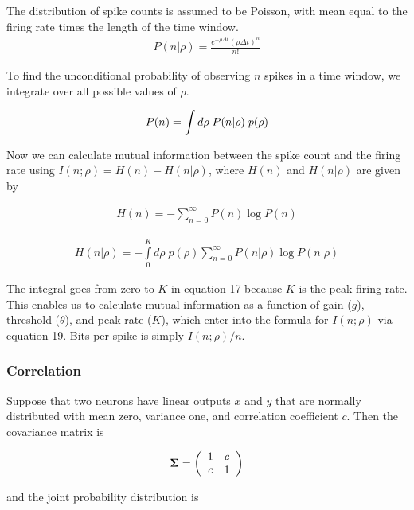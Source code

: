 \documentclass[12pt]{article}
\begin{document}
\noindent The distribution of spike counts is assumed to be Poisson, with mean equal to the firing rate times the length of the time window.
\begin{align}
\displaystyle P(n|\rho) = \frac{e^{-\rho\Delta t}(\rho \Delta t)^n}{n!} \tag{9}
\end{align}

\noindent To find the unconditional probability of observing $n$ spikes in a time window, we integrate over all possible values of $\rho$.

\begin{align}
\displaystyle P(n) =\int d\rho \; P(n|\rho) \; p(\rho) \notag
\end{align}

\noindent Now we can calculate mutual information between the spike count and the firing rate using $I(n;\rho)=H(n)-H(n|\rho)$, where $H(n)$ and $H(n|\rho)$ are given by

\begin{align}
\displaystyle H(n) = -\sum\limits_{n=0}^\infty P(n)\log P(n) \tag{16}
\end{align}

\begin{align}
\displaystyle H(n|\rho) = -\int\limits_0^K d\rho \; p(\rho) \sum\limits_{n=0}^\infty P(n|\rho) \log P(n|\rho) \tag{17}
\end{align}

\noindent The integral goes from zero to $K$ in equation 17 because $K$ is the peak firing rate. This enables us to calculate mutual information as a function of gain ($g$), threshold ($\theta$), and peak rate ($K$), which enter into the formula for $I(n;\rho)$ via equation 19. Bits per spike is simply $I(n;\rho)/n$.

\subsubsection{Correlation}

Suppose that two neurons have linear outputs $x$ and $y$ that are normally distributed with mean zero, variance one, and correlation coefficient $c$. Then the covariance matrix is

\[ {\bf\Sigma} = \left( \begin{array}{cc}
1 & c \\
c & 1 \\
\end{array} \right) \]

\noindent and the joint probability distribution is
\end{document}
